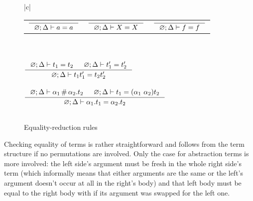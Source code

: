 \documentclass[english, mgr]{iithesis}
\newcommand{\solverRule}{\vdash}
\begin{document}
\begin{figure}[htbp]
    \centering
    \begin{tabular}{|c|}
      \hline \\
      \begin{tabularx}{\textwidth}{CCC} $
      \inference{
      }{
        \emptyenv ; \icEnv \solverRule \atomv = \atomv
      }
      $ & $
      \inference{
      }{
        \emptyenv ; \icEnv \solverRule \termv = \termv
      }
      $ & $
      \inference{
      }{
        \emptyenv ; \icEnv \solverRule \symb = \symb
      }
      $
      \end{tabularx}
      \\ \\ $
      \inference{
        \emptyenv ; \icEnv \solverRule \term_1 = \term_2
        &
        \emptyenv ; \icEnv \solverRule \term_1' = \term_2'
      }{
        \emptyenv ; \icEnv \solverRule \term_1 \term_1' = \term_2 \term_2'
      }
      $ \\ \\ $
      \inference{
        \emptyenv ; \icEnv \solverRule \atomexp_1 \cfresh \tbind{\atomexp_2}\term_2
        &
        \emptyenv ; \icEnv \solverRule \term_1 = \permswap{\atomexp_1}{\atomexp_2} \term_2
      }{
        \emptyenv ; \icEnv \solverRule \tbind{\atomexp_1} \term_1 = \tbind{\atomexp_2} \term_2
      }
      $ \\ \\ \hline
      \end{tabular}
  \caption{Equality-reduction rules}
  \label{fig:equality-reduction-rules}
\end{figure}
Checking equality of terms is rather straightforward and follows from the
term structure if no permutations are involved.
Only the case for abstraction terms is more involved:
the left side's argument must be fresh in the whole right side's term
(which informally means that either arguments are the same or
the left's argument doesn't occur at all in the right's body)
and that left body must be equal to the right body with if its argument was swapped for the left one.
\end{document}
